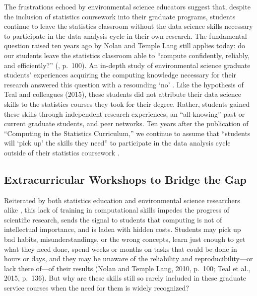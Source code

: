 \documentclass[12pt]{article}
\begin{document}
\quad The frustrations echoed by environmental science educators 
\citep{hampton, datacarpentry} suggest that, despite the inclusion of statistics 
coursework into their graduate programs, students continue to leave the 
statistics classroom without the data science skills necessary to participate in 
the data analysis cycle in their own research. The fundamental question raised 
ten years ago by Nolan and Temple Lang still applies today: do our students
leave the statistics classroom able to ``compute confidently, reliably, and
efficiently?'' (\citeyear{nolan}, p.\ 100). An in-depth study of environmental 
science graduate students' experiences acquiring the computing knowledge
necessary for their research answered this question with a resounding `no' 
\citep{theobold}. Like the hypothesis of Teal and colleagues (2015), these
students did not attribute their data science skills
to the statistics courses they took for their
degree. Rather, students gained these skills through independent research experiences, an
``all-knowing'' past or current graduate students, and peer networks. Ten years 
after the publication of ``Computing in the Statistics Curriculum,'' we continue
to assume that ``students will `pick up' the skills they need'' to participate 
in the data analysis cycle outside of their statistics coursework 
\citep[p.\ 309]{gould}. 

\subsection{Extracurricular Workshops to Bridge the Gap}

\quad Reiterated by both statistics education and environmental science 
researchers alike \citep{nolan, datacarpentry}, this lack of training in 
computational skills impedes the progress of scientific research, sends the 
signal to students that computing is not of intellectual importance, and is 
laden with hidden costs. Students may pick up bad habits, misunderstandings, or 
the wrong concepts, learn just enough to get what they need done, spend weeks or
months on tasks that could be done in hours or days, and they may be unaware of 
the reliability and reproducibility---or lack there of---of their results (Nolan
and Temple Lang, 2010, p.\ 100; Teal et al., 2015, p.\ 136). But why are these
skills still so rarely included in these graduate service courses when the need for them
is widely recognized?
\end{document}
